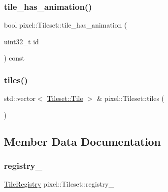 \mbox{\label{classpixel_1_1_tileset_a12eb0d5ebf051a4838a1fe8d829bbe04}} 
\subsubsection{\texorpdfstring{tile\+\_\+has\+\_\+animation()}{tile\_has\_animation()}}
{\footnotesize\ttfamily bool pixel\+::\+Tileset\+::tile\+\_\+has\+\_\+animation (\begin{DoxyParamCaption}\item[{uint32\+\_\+t}]{id }\end{DoxyParamCaption}) const}

\mbox{\label{classpixel_1_1_tileset_a3c1a733757e487ddabf79488c748e3eb}} 
\subsubsection{\texorpdfstring{tiles()}{tiles()}}
{\footnotesize\ttfamily std\+::vector$<$ \hyperlink{structpixel_1_1_tileset_1_1_tile}{Tileset\+::\+Tile} $>$ \& pixel\+::\+Tileset\+::tiles (\begin{DoxyParamCaption}{ }\end{DoxyParamCaption})}



\subsection{Member Data Documentation}
\mbox{\label{classpixel_1_1_tileset_ae1ead42caea0c607c07975e354fc4c1c}} 
\subsubsection{\texorpdfstring{registry\+\_\+}{registry\_}}
{\footnotesize\ttfamily \hyperlink{classpixel_1_1_tileset_a07353350c368c82275a5f821b0b2ee94}{Tile\+Registry} pixel\+::\+Tileset\+::registry\+\_\+\hspace{0.3cm}{\ttfamily [private]}}

